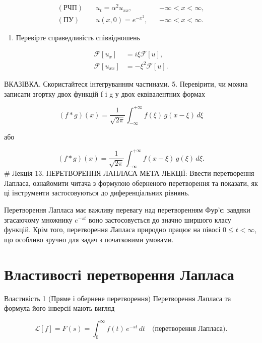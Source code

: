 \[
\begin{aligned}
(\text{РЧП})\quad & u_t = \alpha^2 u_{xx}, && -\infty < x < \infty,\\
(\text{ПУ})\quad & u(x,0)=e^{-x^2}, && -\infty < x < \infty.
\end{aligned}
\]

\begin{enumerate}
\def\labelenumi{\arabic{enumi}.}
\setcounter{enumi}{3}
\tightlist
\item
  Перевірте справедливість співвідношень
\end{enumerate}

\[
\begin{aligned}
\mathcal{F}\left[u_{x}\right] &= i\xi \mathcal{F}\left[u\right], \\
\mathcal{F}\left[u_{xx}\right] &= -\xi^{2} \mathcal{F}\left[u\right].
\end{aligned}
\]

ВКАЗІВКА. Скористайтеся інтегруванням частинами. 5. Перевірити, чи можна записати згортку двох функцій f і g у двох еквівалентних формах

\[
(f * g)(x) = \frac{1}{\sqrt{2\pi}} \int_{-\infty}^{+\infty} f(\xi)\, g(x - \xi)\, d\xi
\]

або

\[
(f * g)(x) = \frac{1}{\sqrt{2\pi}} \int_{-\infty}^{+\infty} f(x-\xi)\, g(\xi)\, d\xi.
\] \# Лекція 13. ПЕРЕТВОРЕННЯ ЛАПЛАСА МЕТА ЛЕКЦІЇ: Ввести перетворення Лапласа, ознайомити читача з формулою оберненого перетворення та показати, як ці інструменти застосовуються до диференціальних рівнянь.

Перетворення Лапласа має важливу перевагу над перетворенням Фур'є: завдяки згасаючому множнику \(e^{-st}\) воно застосовується до значно ширшого класу функцій. Крім того, перетворення Лапласа природно працює на півосі \(0 \le t < \infty\), що особливо зручно для задач з початковими умовами.

\section{Властивості перетворення Лапласа}\label{ux432ux43bux430ux441ux442ux438ux432ux43eux441ux442ux456-ux43fux435ux440ux435ux442ux432ux43eux440ux435ux43dux43dux44f-ux43bux430ux43fux43bux430ux441ux430}

Властивість 1 (Пряме і обернене перетворення) Перетворення Лапласа та формула його інверсії мають вигляд

\[
\mathscr{L}[f] = F(s) = \int_{0}^{\infty} f(t) \, e^{-st} \, dt
\quad \text{(перетворення Лапласа).}
\]

